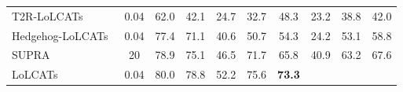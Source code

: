 \begin{table}[ht]
\begin{center}
{\begin{tabular}{l|c|ccccc|c|cc}
                    T2R-LoLCATs~\citep{t2r}
                    & 0.04
                    & 62.0
                    & 42.1
                    & 24.7
                    & 32.7
                    & 48.3
                    & 23.2
                    & 38.8
                    & 42.0
                    \\
                    Hedgehog-LoLCATs~\citep{hedgehog}
                    & 0.04
                    & 77.4
                    & 71.1
                    & 40.6
                    & 50.7
                    & 54.3
                    & 24.2
                    & 53.1
                    & 58.8
                    \\
                    SUPRA~\citep{supra}
                    & 20
                    & 78.9
                    & 75.1
                    & 46.5
                    & 71.7
                    & 65.8
                    & 40.9
                    & 63.2
                    & 67.6
                    \\
                    LoLCATs~\citep{lolcats}
                    & 0.04
                    & 80.0
                    & 78.8
                    & 52.2
                    & 75.6
                    & \textbf{73.3}

\end{tabular}}
\end{center}
\end{table}
